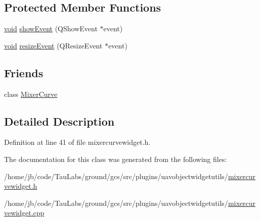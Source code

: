 \subsection*{\-Protected \-Member \-Functions}
\begin{DoxyCompactItemize}
\item 
\hyperlink{group___u_a_v_objects_plugin_ga444cf2ff3f0ecbe028adce838d373f5c}{void} \hyperlink{group___u_a_v_object_widget_utils_gadd0a4729bbf94f44e38a0bcacb353583}{show\-Event} (\-Q\-Show\-Event $\ast$event)
\item 
\hyperlink{group___u_a_v_objects_plugin_ga444cf2ff3f0ecbe028adce838d373f5c}{void} \hyperlink{group___u_a_v_object_widget_utils_gaa93b51b2d0662bf28c5040a7b7386eed}{resize\-Event} (\-Q\-Resize\-Event $\ast$event)
\end{DoxyCompactItemize}
\subsection*{\-Friends}
\begin{DoxyCompactItemize}
\item 
class \hyperlink{group___u_a_v_object_widget_utils_ga4dec7e6867bf4ed62c5309f7149f0dd0}{\-Mixer\-Curve}
\end{DoxyCompactItemize}


\subsection{\-Detailed \-Description}


\-Definition at line 41 of file mixercurvewidget.\-h.



\-The documentation for this class was generated from the following files\-:\begin{DoxyCompactItemize}
\item 
/home/jb/code/\-Tau\-Labs/ground/gcs/src/plugins/uavobjectwidgetutils/\hyperlink{mixercurvewidget_8h}{mixercurvewidget.\-h}\item 
/home/jb/code/\-Tau\-Labs/ground/gcs/src/plugins/uavobjectwidgetutils/\hyperlink{mixercurvewidget_8cpp}{mixercurvewidget.\-cpp}\end{DoxyCompactItemize}
